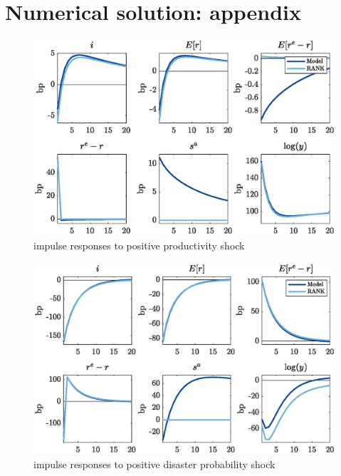 \documentclass[12pt]{article}
\begin{document}
\pagebreak

\section{Numerical solution: appendix}


\begin{figure}[H]
\centering
\includegraphics[width=\textwidth,clip=true,trim=0 20 0 10]{../output/figures/TFP_compact_fig}
\renewcommand\thefigure{A.2}
\caption{impulse responses to positive productivity shock}
\end{figure} 


\begin{figure}[H]
\centering
\includegraphics[width=\textwidth,clip=true,trim=0 20 0 10]{../output/figures/dis_compact_fig}
\renewcommand\thefigure{A.3}
\caption{impulse responses to positive disaster probability shock}
\end{figure} 
\end{document}
